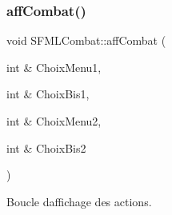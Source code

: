 \mbox{\label{class_s_f_m_l_combat_a4b2bed6ea12c96a58e55d968b1652597}} 
\subsubsection{\texorpdfstring{aff\+Combat()}{affCombat()}}
{\footnotesize\ttfamily void S\+F\+M\+L\+Combat\+::aff\+Combat (\begin{DoxyParamCaption}\item[{int \&}]{Choix\+Menu1,  }\item[{int \&}]{Choix\+Bis1,  }\item[{int \&}]{Choix\+Menu2,  }\item[{int \&}]{Choix\+Bis2 }\end{DoxyParamCaption})\hspace{0.3cm}{\ttfamily [private]}}



Boucle d\textquotesingle{}affichage des actions. 

